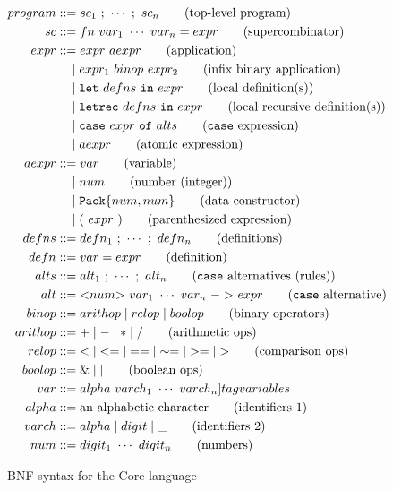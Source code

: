 \begin{figure}
  \centering
  \begin{align*}
    program & ::= sc_1\ ;\ \cdots\ ;\ sc_n\tag{top-level program} \\
    sc & ::= fn\ var_1\ \cdots\ var_n = expr\tag{supercombinator} \\
    expr & ::= expr\ aexpr\tag{application} \\
            & \ \ \ \mid expr_1\ binop\ expr_2\tag{infix binary application} \\
            & \ \ \ \mid \mathtt{let}\ defns\ \mathtt{in}\ expr\tag{local definition(s)} \\
            & \ \ \ \mid \mathtt{letrec}\ defns\ \mathtt{in}\ expr\tag{local recursive definition(s)} \\
            & \ \ \ \mid \mathtt{case}\ expr\ \mathtt{of}\ alts\tag{\texttt{case} expression} \\
            & \ \ \ \mid aexpr\tag{atomic expression} \\
    aexpr & ::= var\tag{variable} \\
            & \ \ \ \mid num\tag{number (integer)} \\
            & \ \ \ \mid \mathtt{Pack\{}num,num\mathtt{\}}\tag{data constructor} \\
            & \ \ \ \mid (\ expr\ )\tag{parenthesized expression} \\
    defns & ::= defn_1\ ;\ \cdots\ ;\ defn_n\tag{definitions} \\
    defn & ::= var=expr\tag{definition} \\
    alts & ::= alt_1\ ;\ \cdots\ ;\ alt_n\tag{\texttt{case} alternatives (rules)} \\
    alt & ::= \mathtt{<} num \mathtt{>}\ var_1\ \cdots\ var_n\ \mathtt{->}\ expr\tag{\texttt{case} alternative} \\
    binop & ::= arithop \mid relop \mid boolop\tag{binary operators} \\
    arithop & ::= \mathtt{+} \mid \mathtt{-} \mid \mathtt{*} \mid \mathtt{/}\tag{arithmetic ops} \\
    relop & ::= \mathtt{<} \mid \mathtt{<=} \mid \mathtt{==} \mid \mathtt{\sim=} \mid \mathtt{>=} \mid \mathtt{>}\tag{comparison ops} \\
    boolop & ::= \mathtt{\&} \mid \mathtt{|}\tag{boolean ops} \\
    var & ::= alpha\ varch_1\ \cdots\ varch_n]tag{variables} \\
    alpha & ::= \text{an alphabetic character}\tag{identifiers 1} \\
    varch & ::= alpha\mid digit\mid \_\tag{identifiers 2} \\
    num & ::= digit_1\ \cdots\ digit_n\tag{numbers}
  \end{align*}
  \caption{BNF syntax for the Core language}
  \label{fig:core-syntax}
\end{figure}

